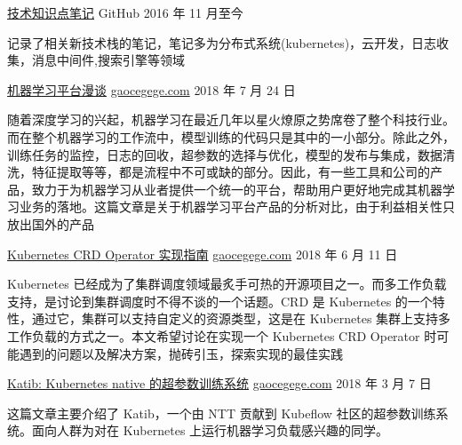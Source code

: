 

\begin{cventries}
  \cventry
    {}
    {\href{https://github.com/tx19980520/new-tech-stack}{技术知识点笔记}}
    {GitHub}
    {2016 年 11 月至今}
    {
      \begin{cvitems} %
        \item 记录了相关新技术栈的笔记，笔记多为分布式系统(kubernetes)，云开发，日志收集，消息中间件,搜索引擎等领域
      \end{cvitems}
    }

  \cventry
    {}
    {\href{http://t.cn/Eh7yABv}{机器学习平台漫谈}}
    {\href{http://gaocegege.com}{gaocegege.com}}
    {2018 年 7 月 24 日}
    {
      \begin{cvitems} %
        \item {
          随着深度学习的兴起，机器学习在最近几年以星火燎原之势席卷了整个科技行业。而在整个机器学习的工作流中，模型训练的代码只是其中的一小部分。除此之外，训练任务的监控，日志的回收，超参数的选择与优化，模型的发布与集成，数据清洗，特征提取等等，都是流程中不可或缺的部分。因此，有一些工具和公司的产品，致力于为机器学习从业者提供一个统一的平台，帮助用户更好地完成其机器学习业务的落地。这篇文章是关于机器学习平台产品的分析对比，由于利益相关性只放出国外的产品
        }
      \end{cvitems}
    }

  \cventry
    {}
    {\href{http://gaocegege.com/Blog/kubernetes/operator}{Kubernetes CRD Operator 实现指南}}
    {\href{http://gaocegege.com}{gaocegege.com}}
    {2018 年 6 月 11 日}
    {
      \begin{cvitems} %
        \item {
          Kubernetes 已经成为了集群调度领域最炙手可热的开源项目之一。而多工作负载支持，是讨论到集群调度时不得不谈的一个话题。CRD 是 Kubernetes 的一个特性，通过它，集群可以支持自定义的资源类型，这是在 Kubernetes 集群上支持多工作负载的方式之一。本文希望讨论在实现一个 Kubernetes CRD Operator 时可能遇到的问题以及解决方案，抛砖引玉，探索实现的最佳实践
        }
      \end{cvitems}
    }

  \cventry
    {}
    {\href{http://t.cn/Eh7UCQx}{Katib: Kubernetes native 的超参数训练系统}}
    {\href{http://gaocegege.com}{gaocegege.com}}
    {2018 年 3 月 7 日}
    {
      \begin{cvitems} %
        \item {
          这篇文章主要介绍了 Katib，一个由 NTT 贡献到 Kubeflow 社区的超参数训练系统。面向人群为对在 Kubernetes 上运行机器学习负载感兴趣的同学。
        }
      \end{cvitems}
    }
\end{cventries}


